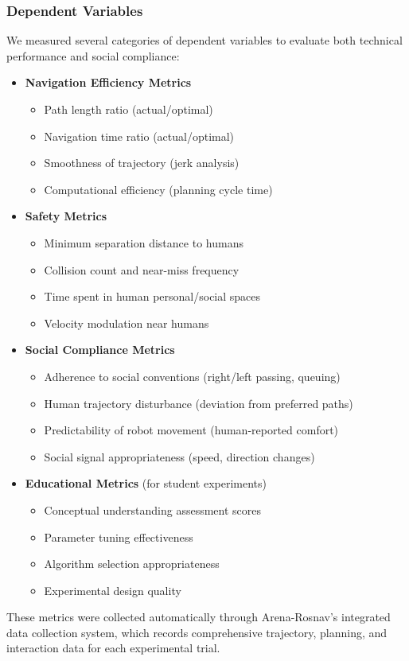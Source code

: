 \subsubsection{Dependent Variables}
\label{subsubsec:dependent_variables}
We measured several categories of dependent variables to evaluate both technical performance 
and social compliance:
\begin{itemize}
    \item \textbf{Navigation Efficiency Metrics}
    \begin{itemize}
        \item Path length ratio (actual/optimal)
        \item Navigation time ratio (actual/optimal)
        \item Smoothness of trajectory (jerk analysis)
        \item Computational efficiency (planning cycle time)
    \end{itemize}
    \item \textbf{Safety Metrics}
    \begin{itemize}
        \item Minimum separation distance to humans
        \item Collision count and near-miss frequency
        \item Time spent in human personal/social spaces
        \item Velocity modulation near humans
    \end{itemize}
    \item \textbf{Social Compliance Metrics}
    \begin{itemize}
        \item Adherence to social conventions (right/left passing, queuing)
        \item Human trajectory disturbance (deviation from preferred paths)
        \item Predictability of robot movement (human-reported comfort)
        \item Social signal appropriateness (speed, direction changes)
    \end{itemize}
    \item \textbf{Educational Metrics} (for student experiments)
    \begin{itemize}
        \item Conceptual understanding assessment scores
        \item Parameter tuning effectiveness
        \item Algorithm selection appropriateness
        \item Experimental design quality
    \end{itemize}
\end{itemize}
These metrics were collected automatically through Arena-Rosnav's integrated data collection system, 
which records comprehensive trajectory, planning, and interaction data for each experimental trial.

